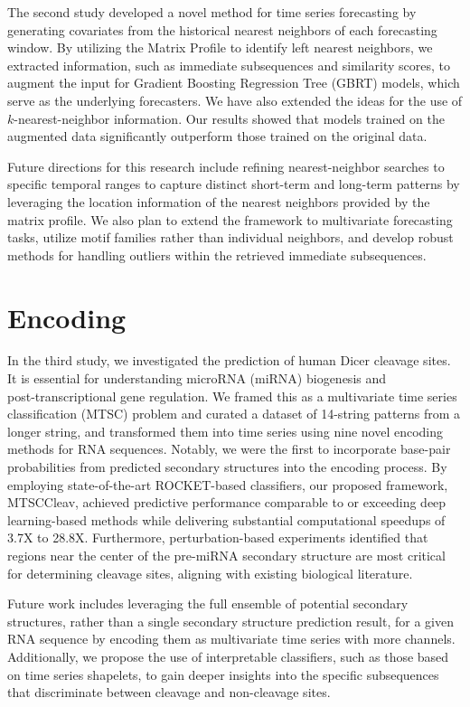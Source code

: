 The second study developed a novel method for time series forecasting by generating covariates from the historical nearest neighbors of each forecasting window. 
By utilizing the Matrix Profile to identify left nearest neighbors, we extracted information, such as immediate subsequences and similarity scores, to augment the input for Gradient Boosting Regression Tree (GBRT) models, which serve as the underlying forecasters. 
We have also extended the ideas for the use of $k$-nearest-neighbor information.
Our results showed that models trained on the augmented data significantly outperform those trained on the original data.

Future directions for this research include refining nearest-neighbor searches to specific temporal ranges to capture distinct short-term and long-term patterns by leveraging the location information of the nearest neighbors provided by the matrix profile. 
We also plan to extend the framework to multivariate forecasting tasks, utilize motif families rather than individual neighbors, and develop robust methods for handling outliers within the retrieved immediate subsequences.

\section{Encoding} %

In the third study, we investigated the prediction of human Dicer cleavage sites.
It is essential for understanding microRNA (miRNA) biogenesis and \\ post-transcriptional gene regulation. 
We framed this as a multivariate time series classification (MTSC) problem and curated a dataset of 14-string patterns from a longer string, and transformed them into time series using nine novel encoding methods for RNA sequences.
Notably, we were the first to incorporate base-pair probabilities from predicted secondary structures into the encoding process.
%
By employing state-of-the-art ROCKET-based classifiers, our proposed framework, MTSCCleav, achieved predictive performance comparable to or exceeding deep learning-based methods while delivering substantial computational speedups of 3.7X to 28.8X. Furthermore, perturbation-based experiments identified that regions near the center of the pre-miRNA secondary structure are most critical for determining cleavage sites, aligning with existing biological literature.

Future work includes leveraging the full ensemble of potential secondary structures, rather than a single secondary structure prediction result, for a given RNA sequence by encoding them as multivariate time series with more channels. 
Additionally, we propose the use of interpretable classifiers, such as those based on time series shapelets, to gain deeper insights into the specific subsequences that discriminate between cleavage and non-cleavage sites.

